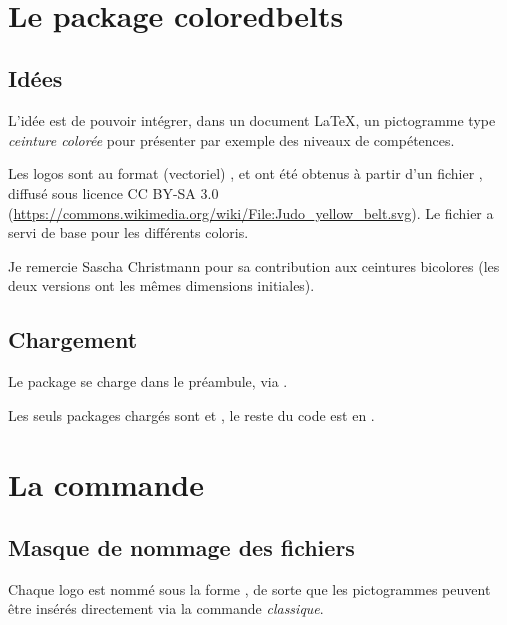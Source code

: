 \documentclass[french,11pt,a4paper]{article}
\begin{document}
\vfill~

\pagebreak

\section{Le package coloredbelts}

\subsection{Idées}

L'idée est de pouvoir intégrer, dans un document \LaTeX, un pictogramme type \textit{ceinture colorée} pour présenter par exemple des niveaux de compétences.

\medskip

Les logos sont au format (vectoriel) , et ont été obtenus à partir d'un fichier , diffusé sous licence CC BY-SA 3.0 (\url{https://commons.wikimedia.org/wiki/File:Judo_yellow_belt.svg}). Le fichier a servi de base pour les différents coloris.

\medskip

Je remercie Sascha Christmann pour sa contribution aux ceintures bicolores (les deux versions ont les mêmes dimensions initiales).

\subsection{Chargement}

Le package se charge dans le préambule, via .

Les seuls packages chargés sont  et , le reste du code est en .

\begin{codehigh}[language=latex/latex2,style/main=cyan!10,style/code=cyan!10]
\usepackage{coloredbelts}
\end{codehigh}

\section{La commande}

\subsection{Masque de nommage des fichiers}

Chaque logo est nommé sous la forme , de sorte que les pictogrammes peuvent être insérés directement via la commande  \textit{classique}.
\end{document}
